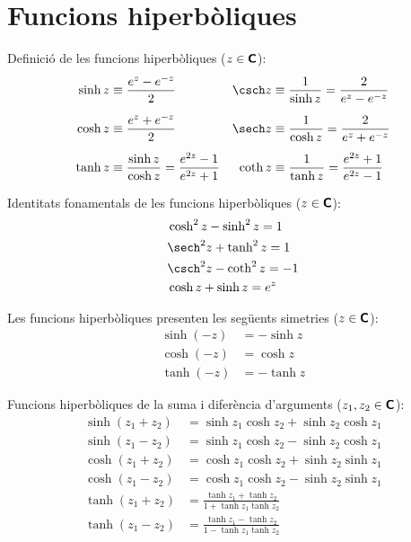 \section{Funcions hiperbòliques}

Definició de les funcions hiperbòliques ($z\in{\ensuremath{\boldsymbol{\mathsf{C}}}}$):
\begin{subequations}
\begin{align}
    \sinh z&\equiv \frac{e^z - e^{-z}}{2} & \csch z &\equiv\frac{1}{\sinh z} =
    \frac{2}{e^z - e^{-z}}\\[1ex]
    \cosh z&\equiv \frac{e^z + e^{-z}}{2} & \sech z &\equiv\frac{1}{\cosh z} =
    \frac{2}{e^z + e^{-z}}\\[1ex]
    \tanh z&\equiv \frac{\sinh z}{\cosh z} = \frac{e^{2z}-1}{e^{2z}+1} &
    \coth z &\equiv\frac{1}{\tanh z} = \frac{e^{2z}+1}{e^{2z}-1}
\end{align}
\end{subequations}

Identitats fonamentals de les funcions hiperbòliques
($z\in{\ensuremath{\boldsymbol{\mathsf{C}}}}$):
\begin{align}
    &\cosh^2 z - \sinh^2 z = 1 \\
    &\sech^2 z + \tanh^2 z = 1 \\
    &\csch^2 z - \coth^2 z = -1 \\
    &\cosh z + \sinh z = e^z
\end{align}

Les funcions hiperbòliques presenten les següents simetries
($z\in{\ensuremath{\boldsymbol{\mathsf{C}}}}$):
\begin{subequations}
\begin{align}
    \sinh (-z) &= -\sinh z \\
    \cosh (-z) &= \cosh z\\
    \tanh (-z) &= -\tanh z
\end{align}
\end{subequations}

Funcions hiperbòliques de la suma i diferència d'arguments ($z_1,
z_2\in{\ensuremath{\boldsymbol{\mathsf{C}}}}$):
\begin{subequations}
\begin{align}
    \sinh(z_1+z_2) &= \sinh z_1 \cosh z_2 + \sinh z_2\cosh z_1\\[1ex]
    \sinh(z_1-z_2) &= \sinh z_1 \cosh z_2 - \sinh z_2\cosh z_1\\[1ex]
    \cosh(z_1+z_2) &= \cosh z_1 \cosh z_2 + \sinh z_2\sinh z_1\\[1ex]
    \cosh(z_1-z_2) &= \cosh z_1 \cosh z_2 - \sinh z_2\sinh z_1\\[1ex]
    \tanh(z_1+z_2) &=\frac{\tanh z_1+\tanh z_2}{1+\tanh z_1\tanh z_2}\\[1ex]
    \tanh(z_1-z_2) &=\frac{\tanh z_1-\tanh z_2}{1-\tanh z_1\tanh z_2}
\end{align}
\end{subequations}

